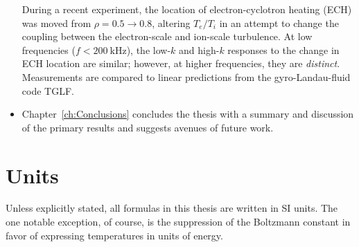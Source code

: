 \begin{itemize}
    During a recent \diiid\space experiment,
    the location of electron-cyclotron heating (ECH)
    was moved from $\rho = 0.5 \rightarrow 0.8$,
    altering $T_e / T_i$
    in an attempt to change the coupling between
    the electron-scale and ion-scale turbulence.
    At low frequencies ($f < \SI{200}{\kilo\hertz}$),
    the low-$k$ and high-$k$ responses to the change in ECH location
    are similar;
    however, at higher frequencies, they are \emph{distinct}.
    Measurements are compared to linear predictions
    from the gyro-Landau-fluid code TGLF.
  \item Chapter~\ref{ch:Conclusions} concludes the thesis
    with a summary and discussion of the primary results
    and suggests avenues of future work.
\end{itemize}


\section{Units}
Unless explicitly stated, all formulas in this thesis are written in SI units.
The one notable exception, of course,
is the suppression of the Boltzmann constant
in favor of expressing temperatures in units of energy.




